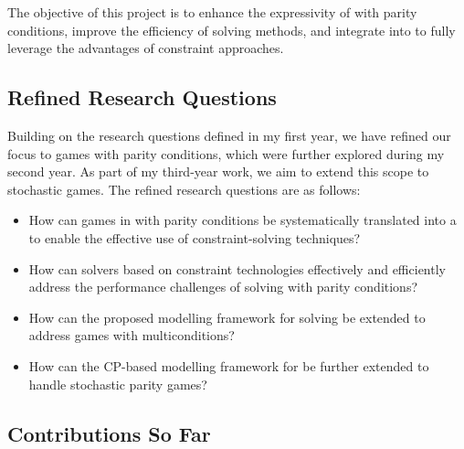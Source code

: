 \documentclass{article}
\begin{document}
The objective of this project is to enhance the expressivity of \wregulargames with parity conditions, improve the efficiency of solving methods, and integrate \wregulargames into \constraintgames to fully leverage the advantages of constraint approaches.

\subsection{Refined Research Questions}

Building on the research questions defined in my first year, we have refined our focus to games with parity conditions, which were further explored during my second year. As part of my third-year work, we aim to extend this scope to stochastic games. The refined research questions are as follows:

\begin{itemize}[left=1.2cm]\label{sec:rq}
    \item[\textbf{RQ1}] How can games in \wregularform with parity conditions be systematically translated into a \constraintform to enable the effective use of constraint-solving techniques?

    \item[\textbf{RQ2}] How can solvers based on constraint technologies effectively and efficiently address the performance challenges of solving \wregulargames with parity conditions?

    \item[\textbf{RQ3}] How can the proposed modelling framework for solving \wregulargames be extended to address games with multiconditions?

    \item[\textbf{RQ4}] How can the CP-based modelling framework for \wregulargames be further extended to handle stochastic parity games?
\end{itemize}

\subsection{Contributions So Far}
\end{document}
